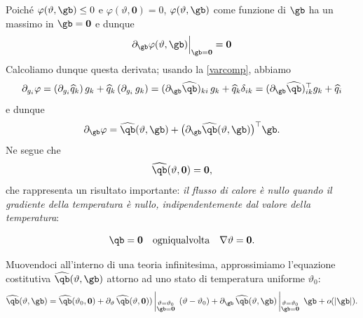 Poiché $\varphi(\vartheta, \gb)\leq 0$ e $\varphi(\vartheta, \mathbf{0})=0$, $\varphi(\vartheta, \gb)$ come funzione di $\gb$ ha un massimo in $\gb=\mathbf{0}$ e dunque
\begin{equation}
\partial_\gb \varphi(\vartheta, \gb)\Big|_{\gb=\mathbf{0}}=\mathbf{0}
\end{equation}
Calcoliamo dunque questa derivata; usando la \eqref{varcomp}, abbiamo
\begin{equation}\label{derf}
\partial_{g_i}\varphi=(\partial_{g_i}\widehat{q}_{k}) \,g_k+\widehat{q}_k\,(\partial_{g_i}\,g_k)=(\partial_\gb\widehat{\qb})_{ki}\, g_k+\widehat{q}_k\delta_{ik}=(\partial_\gb\widehat{\qb})^\top_{ik}g_k+ \widehat{q}_i
\end{equation}
e dunque
\begin{equation}\label{Dfg}
\partial_{\gb}\varphi=\widehat{\qb}(\vartheta,\gb ) +\big( \partial_\gb\widehat{\qb}(\vartheta,\gb) \big)^\top \gb.
\end{equation}
Ne segue che
\begin{equation}\label{q0}
\widehat{\qb}(\vartheta, \mathbf{0})=\mathbf{0},
\end{equation}
che rappresenta un risultato importante: \textit{il flusso di calore è nullo quando il gradiente della temperatura è  nullo, indipendentemente dal valore della temperatura}:
\begin{definition}
	\begin{equation}
	\qb =\mathbf{0} \quad \textrm{ogniqualvolta}\quad \nabla\vartheta=\mathbf{0}.
\end{equation}
\end{definition}

Muovendoci all'interno di una teoria infinitesima, approssimiamo l'equazione costitutiva $\widehat{\qb}(\vartheta, \gb)$ attorno ad uno stato di temperatura uniforme $\vartheta_0$:
\begin{equation}
\widehat{\qb}(\vartheta, \gb)=\widehat{\qb}(\vartheta_0, \mathbf{0})+\partial_\vartheta\, \widehat{\qb}(\vartheta, \mathbf{0}))\left|_{\substack{ \vartheta=\vartheta_0\\ \gb=\mathbf{0}  }}\right.\,(\vartheta-\vartheta_0)+\partial_\gb\, \widehat{\qb}(\vartheta, \gb)\left|_{\substack{ \vartheta=\vartheta_0\\ \gb=\mathbf{0}  }}\right.\,\gb+o(|\gb|).
\end{equation}



